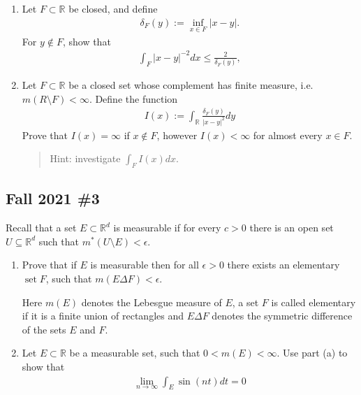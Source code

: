 \begin{enumerate}
\def\labelenumi{\alph{enumi}.}
\item
  Let \(F \subset \mathbb{R}\) be closed, and define
  \begin{align*}
  \delta_{F}(y):=\inf _{x \in F}|x-y| .
  \end{align*}
  For \(y \notin F\), show that
  \begin{align*}
  \int_{F}|x-y|^{-2} d x \leq \frac{2}{\delta_F(y)},
  \end{align*}
\item
  Let \(F \subset \mathbb{R}\) be a closed set whose complement has
  finite measure, i.e.~\(m(R \setminus F)< \infty\). Define the function
  \begin{align*}
  I(x):=\int_{\mathbb{R}} \frac{\delta_{F}(y)}{|x-y|^{2}} d y
  \end{align*}
  Prove that \(I(x)=\infty\) if \(x \not\in F\), however \(I(x)<\infty\)
  for almost every \(x \in F\).

  \begin{quote}
  Hint: investigate \(\int_{F} I(x) d x\).
  \end{quote}
\end{enumerate}

\hypertarget{fall-2021-3}{%
\subsection{Fall 2021 \#3}\label{fall-2021-3}}

Recall that a set \(E \subset \mathbb{R}^{d}\) is measurable if for
every \(c>0\) there is an open set \(U \subseteq {\mathbb{R}}^d\) such
that \(m^{*}(U \setminus E)<\epsilon\).

\begin{enumerate}
\def\labelenumi{\alph{enumi}.}
\item
  Prove that if \(E\) is measurable then for all \(\epsilon>0\) there
  exists an elementary \(\operatorname{set} F\), such that
  \(m(E \Delta F)<\epsilon\).

  Here \(m(E)\) denotes the Lebesgue measure of \(E\), a set \(F\) is
  called elementary if it is a finite union of rectangles and
  \(E \Delta F\) denotes the symmetric difference of the sets \(E\) and
  \(F\).
\item
  Let \(E \subset \mathbb{R}\) be a measurable set, such that
  \(0<m(E)<\infty\). Use part (a) to show that
  \begin{align*}
  \lim _{n \rightarrow \infty} \int_{E} \sin (n t) d t=0
  \end{align*}
\end{enumerate}

